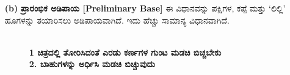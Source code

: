 \begin{enumerate}
\item[{\bf (b)}] \textbf{ಪ್ರಾರಂಭಿಕ ಅಡಿಪಾಯ [Preliminary Base]}
ಈ ವಿಧಾನವನ್ನು ಪಕ್ಷಿಗಳ, ಕಪ್ಪೆ  ಮತ್ತು `ಲಿಲ್ಲಿ' ಹೂಗಳನ್ನು ತಯಾರಿಸಲು ಅಡಿಪಾಯವಾಗಿದೆ. ಇದು ಹೆಚ್ಚು \hbox{ಸಾಮಾನ್ಯ} ವಿಧಾನವಾಗಿದೆ. 

\vspace{-.3cm}

\begin{figure}[H]
\\
\textbf{1 ಚಿತ್ರದಲ್ಲಿ ತೋರಿಸಿದಂತೆ ಎರಡು ಕರ್ಣಗಳ ಗುಂಟ ಮಡಚಿ ಬಿಚ್ಚಬೇಕು}\\
\textbf{2. ಬಾಹುಗಳನ್ನು ಅರ್ಧಿಸಿ ಮಡಚಿ ಬಿಚ್ಚುವುದು}
\end{figure}



\end{enumerate}

